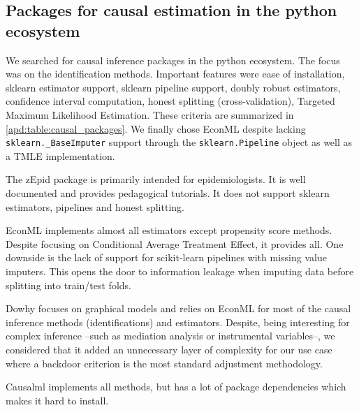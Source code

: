 \documentclass[french,12pt,twoside,a4paper]{book}
\begin{document}
\begin{appendices}
  \subsection{Packages for causal estimation in the python
    ecosystem}\label{apd:packages}

  We searched for causal inference packages in the python ecosystem. The focus
  was on the identification methods. Important features were ease of
  installation, sklearn estimator support, sklearn pipeline support, doubly
  robust estimators, confidence interval computation, honest splitting
  (cross-validation), Targeted Maximum Likelihood Estimation. These criteria are
  summarized in \ref{apd:table:causal_packages}. We finally chose EconML despite
  lacking \texttt{sklearn.\_BaseImputer} support through the
  \texttt{sklearn.Pipeline} object as well as a TMLE implementation.

  The zEpid package is primarily intended for epidemiologists. It is well documented
  and provides pedagogical tutorials. It does not support sklearn estimators,
  pipelines and honest splitting.

  EconML implements almost all estimators except propensity score methods. Despite
  focusing on Conditional Average Treatment Effect, it provides all. One downside
  is the lack of support for scikit-learn pipelines with missing value imputers.
  This opens the door to information leakage when imputing data before splitting
  into train/test folds.

  Dowhy focuses on graphical models and relies on EconML for most of the causal
  inference methods (identifications) and estimators. Despite, being interesting
  for complex inference --such as mediation analysis or instrumental variables--,
  we considered that it added an unnecessary layer of complexity for our use case
  where a backdoor criterion is the most standard adjustment methodology.

  Causalml implements all methods, but has a lot of package dependencies
  which makes it hard to install.


\end{appendices}
\end{document}
